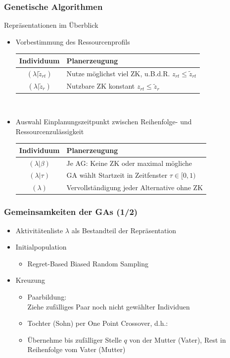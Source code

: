 \begin{frame}
\frametitle{Genetische Algorithmen}
Repräsentationen im Überblick
\begin{itemize}
	\item Vorbestimmung des Ressourcenprofils\\[2mm]
	\begin{small}
	\begin{tabular}{cp{7.5cm}}
	\hline
	Individuum & Planerzeugung\\
	\hline
	\hline
	 $(\lambda|\tilde{z}_{rt})$ & Nutze möglichst viel ZK, u.B.d.R. $z_{rt} \leq \tilde{z}_{rt}$ \\
	 \hline
	 $(\lambda|\tilde{z}_r)$ &  Nutzbare ZK konstant $z_{rt} \leq \tilde{z}_{r}$\\
	 \hline
	\end{tabular}
	\end{small}\\[4mm]

	\item Auswahl Einplanungszeitpunkt zwischen Reihenfolge- und Ressourcenzulässigkeit\\[2mm]
	\begin{small}
	\begin{tabular}{cp{7.5cm}}
	\hline
	Individuum & Planerzeugung\\
	\hline
	\hline
	$(\lambda|\beta)$& Je AG: Keine ZK oder maximal mögliche\\
	\hline	
	$(\lambda|\tau)$& GA wählt Startzeit in Zeitfenster $\tau \in [0,1)$\\
	\hline
	$(\lambda)$ & Vervollständigung jeder Alternative ohne ZK\\
	\hline
	\end{tabular}
	\end{small}
\end{itemize}


\end{frame}

\begin{frame}
\frametitle{Gemeinsamkeiten der GAs (1/2)}
\begin{itemize}
\item Aktivitätenliste $\lambda$ als Bestandteil der Repräsentation
\item Initialpopulation

\begin{itemize}\item Regret-Based Biased Random Sampling\end{itemize}
\item Kreuzung
	\begin{itemize}
	\item Paarbildung:\\Ziehe zufälliges Paar noch nicht gewählter Individuen\\[4mm]
	\item Tochter (Sohn) per One Point Crossover, d.h.:
	\item[] Übernehme bis zufälliger Stelle $q$ von der Mutter (Vater), Rest in Reihenfolge vom Vater (Mutter)
	\end{itemize}
\end{itemize}
\end{frame}

